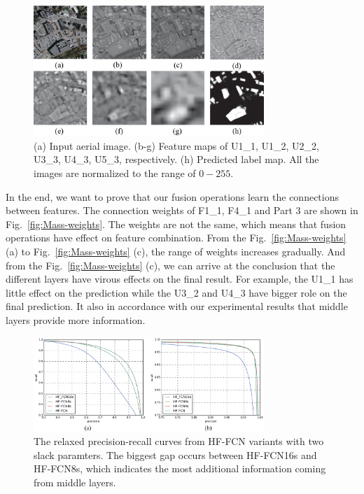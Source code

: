 \begin{figure}
\begin{center}
\includegraphics[width=8.7cm]{Figures/feature_maps.eps}
\caption{(a) Input aerial image. (b-g) Feature maps of U1\_1, U1\_2, U2\_2, U3\_3, U4\_3, U5\_3, respectively. (h) Predicted label map. All the images are normalized to the range of ${0-255}$.}
\label{fig:feature_maps}
\end{center}
\end{figure}


In the end, we want to prove that our fusion operations learn the connections between features. The connection weights of F1\_1, F4\_1 and Part 3 are shown in Fig.~\ref{fig:Mass-weights}.
The weights are not the same, which means that fusion operations have effect on feature combination.
From the Fig.~\ref{fig:Mass-weights} (a) to Fig.~\ref{fig:Mass-weights} (c), the range of weights increases gradually. And from the Fig.~\ref{fig:Mass-weights} (c), we can arrive at the conclusion that the different layers have virous effects on the final result.
For example, the U1\_1 has little effect on the prediction while the U3\_2 and U4\_3 have bigger role on the final prediction.
It also in accordance with our experimental results that middle layers provide more information.

\begin{figure}
\centering
\includegraphics[width=8.7cm]{Figures/HF-FCN-variant-PR.eps}
\caption{The relaxed precision-recall curves from HF-FCN variants with two slack paramters. The biggest gap occurs between HF-FCN16s and HF-FCN8s, which indicates the most additional information coming from middle layers.}
\label{fig:Mass-variants-PR}
\end{figure}

